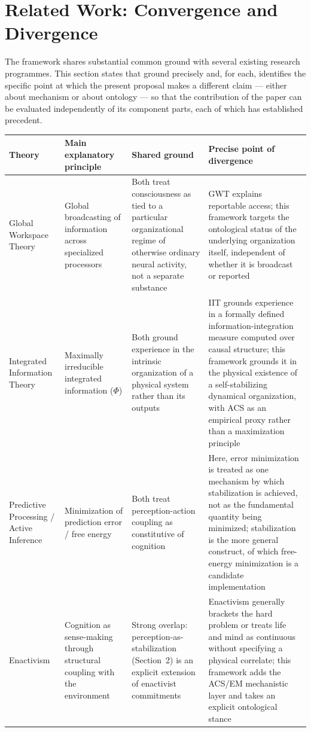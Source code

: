 \documentclass[11pt]{article}
\begin{document}
\section{Related Work: Convergence and Divergence}

The framework shares substantial common ground with several existing research programmes. This section states that ground precisely and, for each, identifies the specific point at which the present proposal makes a different claim --- either about mechanism or about ontology --- so that the contribution of the paper can be evaluated independently of its component parts, each of which has established precedent.

\begin{longtable}{p{2.7cm}p{3.1cm}p{3.9cm}p{4.3cm}}
\toprule
\textbf{Theory} & \textbf{Main explanatory principle} & \textbf{Shared ground} & \textbf{Precise point of divergence} \\
\midrule
\endhead
Global Workspace Theory \citep*{baars1988,dehaene2001} & Global broadcasting of information across specialized processors & Both treat consciousness as tied to a particular organizational regime of otherwise ordinary neural activity, not a separate substance & GWT explains reportable access; this framework targets the ontological status of the underlying organization itself, independent of whether it is broadcast or reported \\[4pt]
Integrated Information Theory \citep*{tononi2004,tononi2016} & Maximally irreducible integrated information ($\Phi$) & Both ground experience in the intrinsic organization of a physical system rather than its outputs & IIT grounds experience in a formally defined information-integration measure computed over causal structure; this framework grounds it in the physical existence of a self-stabilizing dynamical organization, with ACS as an empirical proxy rather than a maximization principle \\[4pt]
Predictive Processing / Active Inference \citep*{friston2010,clark2013,hohwy2013} & Minimization of prediction error / free energy & Both treat perception-action coupling as constitutive of cognition & Here, error minimization is treated as one mechanism by which stabilization is achieved, not as the fundamental quantity being minimized; stabilization is the more general construct, of which free-energy minimization is a candidate implementation \\[4pt]
Enactivism \citep*{varela1991,thompson2007,noe2004} & Cognition as sense-making through structural coupling with the environment & Strong overlap: perception-as-stabilization (Section~2) is an explicit extension of enactivist commitments & Enactivism generally brackets the hard problem or treats life and mind as continuous without specifying a physical correlate; this framework adds the ACS/EM mechanistic layer and takes an explicit ontological stance \\[4pt]

\end{longtable}
\end{document}
